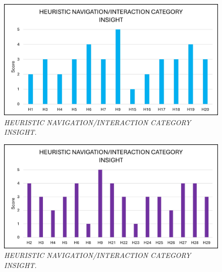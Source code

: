 \begin{figure}[h]
	\includegraphics[width=\textwidth]{Visual_illustration_4.jpg}
	\caption{\textit{HEURISTIC NAVIGATION/INTERACTION CATEGORY INSIGHT.}}
	\label{fig:label4}
\end{figure}
\begin{figure}[h]
	\includegraphics[width=\textwidth]{Visual_illustration_5.jpg}
	\caption{\textit{HEURISTIC NAVIGATION/INTERACTION CATEGORY INSIGHT.}}
	\label{fig:label5}
\end{figure}
